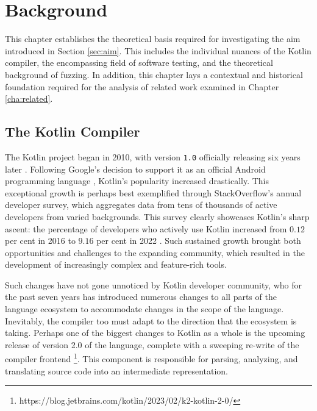 \chapter{\label{cha:background}Background} 

This chapter establishes the theoretical basis
required for investigating the aim introduced in
Section \ref{sec:aim}.
This includes the individual nuances of the Kotlin compiler,
the encompassing field of software testing, and the theoretical
background of fuzzing.
In addition, this chapter lays a contextual and historical foundation
required for the analysis of related work examined in Chapter \ref{cha:related}.

\section{The Kotlin Compiler}

The Kotlin project began in 2010, with version \texttt{1.0}
officially releasing six years later \citep{stepanov2021type}.
Following Google's decision to support it as an official Android
programming language \cite{kotlin5years}, Kotlin's popularity increased drastically.
This exceptional growth is perhaps best exemplified through
StackOverflow's annual developer survey, which aggregates data from
tens of thousands of active developers from varied backgrounds.
This survey clearly showcases Kotlin's sharp ascent: the percentage of
developers who actively use Kotlin increased from $0.12$ per cent in 2016
to $9.16$ per cent in 2022 \citep{sosurvey2016, sosurvey2022}. 
Such sustained growth brought both opportunities and challenges to the
expanding community, which resulted in the development of increasingly
complex and feature-rich tools.

Such changes have not gone unnoticed by Kotlin developer
community, who for the past seven years has introduced numerous
changes to all parts of the language ecosystem to
accommodate changes in the scope of the language.
Inevitably, the compiler too must adapt to the direction that the ecosystem is taking.
Perhaps one of the biggest changes to Kotlin as a whole
is the upcoming release of version 2.0 of the language,
complete with a sweeping re-write of the compiler
frontend \footnote{https://blog.jetbrains.com/kotlin/2023/02/k2-kotlin-2-0/}.
This component is responsible for parsing, analyzing, and translating source code
into an intermediate representation.

